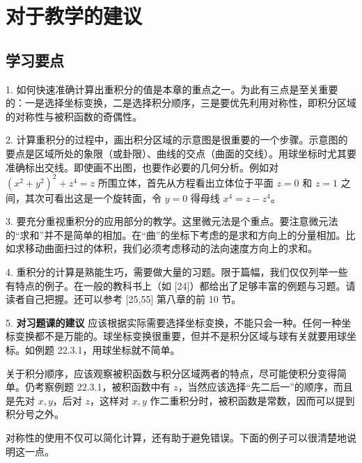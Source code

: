\section{对于教学的建议}

\subsection{学习要点}

1. 如何快速准确计算出重积分的值是本章的重点之一。为此有三点是至关重要的：一是选择坐标变换，二是选择积分顺序，三是要优先利用对称性，即积分区域的对称性与被积函数的奇偶性。

2. 计算重积分的过程中，画出积分区域的示意图是很重要的一个步骤。示意图的要点是区域所处的象限（或卦限）、曲线的交点（曲面的交线）。用球坐标时尤其要准确标出交线。即使画不出图，也要作必要的几何分析。例如对 $(x^2+y^2)^2+z^4=z$ 所围立体，首先从方程看出立体位于平面 $z=0$ 和 $z=1$ 之间，其次可看出这是一个旋转面，令 $y=0$ 得母线 $x^4=z-z^4$。

3. 要充分重视重积分的应用部分的教学。这里微元法是个重点。要注意微元法的“求和”并不是简单的相加。在“曲”的坐标下考虑的是求和方向上的分量相加。比如求移动曲面扫过的体积，我们必须考虑移动的法向速度方向上的求和。

4. 重积分的计算是熟能生巧，需要做大量的习题。限于篇幅，我们仅仅列举一些有特点的例子。在一般的教科书上（如 [24]）都给出了足够丰富的例题与习题。请读者自己把握。还可以参考 [25,55] 第八章的前 10 节。

5. \textbf{对习题课的建议}
应该根据实际需要选择坐标变换，不能只会一种。任何一种坐标变换都不是万能的。球坐标变换很重要，但并不是积分区域与球有关就要用球坐标。如例题 22.3.1，用球坐标就不简单。

关于积分顺序，应该观察被积函数与积分区域两者的特点，尽可能使积分变得简单。仍考察例题 22.3.1，被积函数中有 $z$，当然应该选择“先二后一”的顺序，而且是先对 $x,y$，后对 $z$，这样对 $x,y$ 作二重积分时，被积函数是常数，因而可以提到积分号之外。

对称性的使用不仅可以简化计算，还有助于避免错误。下面的例子可以很清楚地说明这一点。

